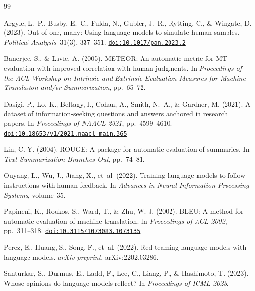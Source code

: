 \documentclass[11pt,a4paper]{article}
\begin{document}
\begin{thebibliography}{99}

Argyle, L.~P., Busby, E.~C., Fulda, N., Gubler, J.~R., Rytting, C., \&
Wingate, D. (2023).
\newblock Out of one, many: Using language models to simulate human samples.
\newblock \emph{Political Analysis}, 31(3), 337--351.
\newblock \href{https://doi.org/10.1017/pan.2023.2}{\texttt{doi:10.1017/pan.2023.2}}

Banerjee, S., \& Lavie, A. (2005).
\newblock METEOR: An automatic metric for MT evaluation with improved
correlation with human judgments.
\newblock In \emph{Proceedings of the ACL Workshop on Intrinsic and Extrinsic
Evaluation Measures for Machine Translation and/or Summarization}, pp.\ 65--72.

Dasigi, P., Lo, K., Beltagy, I., Cohan, A., Smith, N.~A., \& Gardner, M.
(2021).
\newblock A dataset of information-seeking questions and answers anchored in
research papers.
\newblock In \emph{Proceedings of NAACL 2021}, pp.\ 4599--4610.
\newblock \href{https://doi.org/10.18653/v1/2021.naacl-main.365}{\texttt{doi:10.18653/v1/2021.naacl-main.365}}

Lin, C.-Y. (2004).
\newblock ROUGE: A package for automatic evaluation of summaries.
\newblock In \emph{Text Summarization Branches Out}, pp.\ 74--81.

Ouyang, L., Wu, J., Jiang, X., et~al. (2022).
\newblock Training language models to follow instructions with human feedback.
\newblock In \emph{Advances in Neural Information Processing Systems},
volume~35.

Papineni, K., Roukos, S., Ward, T., \& Zhu, W.-J. (2002).
\newblock BLEU: A method for automatic evaluation of machine translation.
\newblock In \emph{Proceedings of ACL 2002}, pp.\ 311--318.
\newblock \href{https://doi.org/10.3115/1073083.1073135}{\texttt{doi:10.3115/1073083.1073135}}

Perez, E., Huang, S., Song, F., et~al. (2022).
\newblock Red teaming language models with language models.
\newblock \emph{arXiv preprint}, arXiv:2202.03286.

Santurkar, S., Durmus, E., Ladd, F., Lee, C., Liang, P., \& Hashimoto, T.
(2023).
\newblock Whose opinions do language models reflect?
\newblock In \emph{Proceedings of ICML 2023}.


\end{thebibliography}
\end{document}
